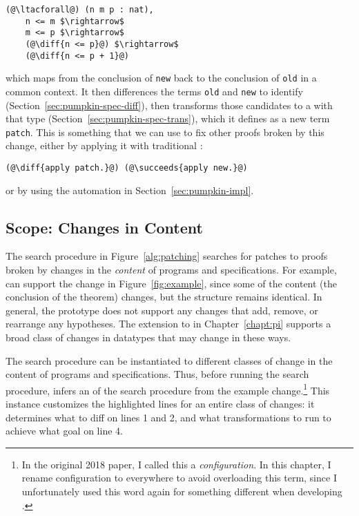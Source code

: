 \begin{lstlisting}[language=coq]
  (@\ltacforall@) (n m p : nat),
    n <= m $\rightarrow$
    m <= p $\rightarrow$
    (@\diff{n <= p}@) $\rightarrow$
    (@\diff{n <= p + 1}@)
\end{lstlisting}
which maps from the conclusion of \lstinline{new} back to the conclusion of \lstinline{old} in a common context.
It then differences the terms \lstinline{old} and \lstinline{new} to identify  (Section~\ref{sec:pumpkin-spec-diff}),
then transforms those candidates to a  with that type (Section~\ref{sec:pumpkin-spec-trans}),
which it defines as a new term \lstinline{patch}.
This is something that we can use to fix other proofs broken by this change, either by applying it with traditional :

\begin{lstlisting}[language=coq]
  (@\diff{apply patch.}@) (@\succeeds{apply new.}@)
\end{lstlisting}
or by using the automation in Section~\ref{sec:pumpkin-impl}.

\subsection{Scope: Changes in Content}
\label{sec:pumpkin-scope}

The search procedure in Figure~\ref{alg:patching} searches for patches to proofs broken by changes in the \textit{content} of programs and specifications.
For example, \sysname can support the change in Figure~\ref{fig:example}, since some of the content (the conclusion of the theorem) changes,
but the structure remains identical.
In general, the \sysname prototype does not support any changes that add, remove, or rearrange any hypotheses.
The \toolnamec extension to \sysnamelong in Chapter~\ref{chapt:pi} supports a broad class of changes
in datatypes that may change in these ways.

The search procedure can be instantiated to different classes of change in the content of programs and specifications.
Thus, before running the search procedure, \sysname infers an  of the search 
procedure from the example change.\footnote{In the original 2018 \sysnamelong paper, I called this a \textit{configuration}.
In this chapter, I rename configuration to  everywhere to avoid overloading this term,
since I unfortunately used this word again for something different when developing \toolnamec.}
This instance customizes the highlighted lines for an entire class of changes:
it determines what to diff on lines 1 and 2,
and what transformations to run to achieve what goal on line 4.

